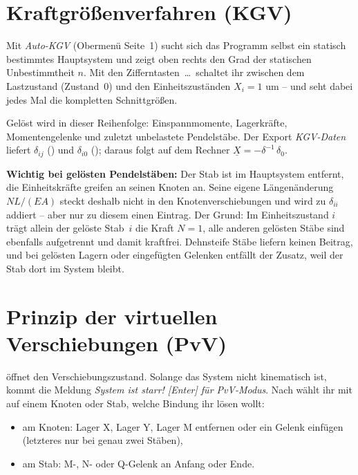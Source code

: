 \section{Kraftgrößenverfahren (KGV)}\label{sec:kgv}

Mit \emph{Auto-KGV} (Obermenü Seite~1) sucht sich das Programm selbst ein statisch bestimmtes
Hauptsystem und zeigt oben rechts den Grad der statischen Unbestimmtheit $n$. Mit den
Zifferntasten \,\dots\, schaltet ihr zwischen dem Lastzustand (Zustand~0) und
den Einheitszuständen $X_i = 1$ um -- und seht dabei jedes Mal die kompletten Schnittgrößen.

Gelöst wird in dieser Reihenfolge: Einspannmomente, Lagerkräfte, Momentengelenke und zuletzt
unbelastete Pendelstäbe. Der Export \emph{KGV-Daten} liefert $\delta_{ij}$ () und
$\delta_{i0}$ (); daraus folgt auf dem Rechner
$\underline{X} = -\delta^{-1}\,\delta_0$.

\textbf{Wichtig bei gelösten Pendelstäben:} Der Stab ist im Hauptsystem entfernt, die
Einheitskräfte greifen an seinen Knoten an. Seine eigene Längenänderung $NL/(EA)$ steckt deshalb
nicht in den Knotenverschiebungen und wird zu $\delta_{ii}$ addiert -- aber nur zu diesem einen
Eintrag. Der Grund: Im Einheitszustand $i$ trägt allein der gelöste Stab~$i$ die Kraft $N = 1$,
alle anderen gelösten Stäbe sind ebenfalls aufgetrennt und damit kraftfrei. Dehnsteife Stäbe
liefern keinen Beitrag, und bei gelösten Lagern oder eingefügten Gelenken entfällt der Zusatz,
weil der Stab dort im System bleibt.

\section{Prinzip der virtuellen Verschiebungen (PvV)}

 öffnet den Verschiebungszustand. Solange das System nicht kinematisch ist, kommt die
Meldung \emph{System ist starr! [Enter] für PvV-Modus}. Nach  wählt ihr mit
 auf einem Knoten oder Stab, welche Bindung ihr lösen wollt:

\begin{itemize}
  \item am Knoten: Lager X, Lager Y, Lager M entfernen oder ein Gelenk einfügen (letzteres nur
        bei genau zwei Stäben),
  \item am Stab: M-, N- oder Q-Gelenk an Anfang oder Ende.
\end{itemize}

